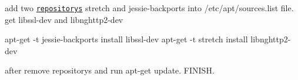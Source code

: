 add two \href{https://github.com/superjamie/lazyweb/wiki/Raspberry-Pi-Debian-Backports}{\tt repositorys} stretch and jessie-\/backports into /etc/apt/sources.list file. get libssl-\/dev and libnghttp2-\/dev 
\begin{DoxyCode}
apt-get -t jessie-backports install libssl-dev
apt-get -t stretch install libnghttp2-dev
\end{DoxyCode}
 after remove repositorys and run apt-\/get update. F\+I\+N\+I\+SH. 